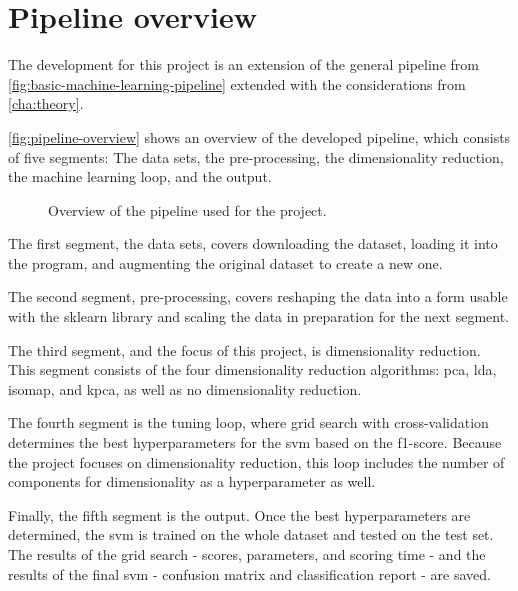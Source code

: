 \section{Pipeline overview}\label{sec:pipeline-overview}
The development for this project is an extension of the general pipeline from \autoref{fig:basic-machine-learning-pipeline} extended with the considerations from \autoref{cha:theory}.

\autoref{fig:pipeline-overview} shows an overview of the developed pipeline, which consists of five segments: The data sets, the pre-processing, the dimensionality reduction, the machine learning loop, and the output.


\begin{figure}[b!]
    \centering
    
    \caption{Overview of the pipeline used for the project.}
    \label{fig:pipeline-overview}
\end{figure}


The first segment, the data sets, covers downloading the dataset, loading it into the program, and augmenting the original dataset to create a new one.

The second segment, pre-processing, covers reshaping the data into a form usable with the \gls{sklearn} library and scaling the data in preparation for the next segment.

The third segment, and the focus of this project, is dimensionality reduction. This segment consists of the four dimensionality reduction algorithms: \gls{pca}, \gls{lda}, \gls{isomap}, and \gls{kpca}, as well as no dimensionality reduction.

The fourth segment is the tuning loop, where grid search with cross-validation determines the best hyperparameters for the \gls{svm} based on the f1-score. Because the project focuses on dimensionality reduction, this loop includes the number of components for dimensionality as a hyperparameter as well.

Finally, the fifth segment is the output. Once the best hyperparameters are determined, the \gls{svm} is trained on the whole dataset and tested on the test set. The results of the grid search - scores, parameters, and scoring time - and the results of the final \gls{svm} - confusion matrix and classification report - are saved.


%     
